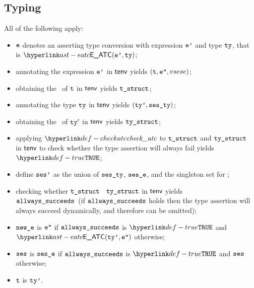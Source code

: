 \subsection{Typing}
\ProseParagraph
All of the following apply:
\begin{itemize}
  \item $\texttt{e}$ denotes an asserting type conversion with expression $\texttt{e'}$ and type $\texttt{ty}$, that is $\EATC(\vep, \tty)$;
  \item annotating the expression $\texttt{e'}$ in $\textsf{tenv}$ yields $(\texttt{t}, \texttt{e''}, \\vsese)$\ProseOrTypeError;
  \item obtaining the \structure\ of $\texttt{t}$ in $\textsf{tenv}$ yields $\texttt{t\_struct}$\ProseOrTypeError;
  \item annotating the type $\texttt{ty}$ in $\textsf{tenv}$ yields $(\texttt{ty'}, \texttt{ses\_ty})$\ProseOrTypeError;
  \item obtaining the \structure\ of $\texttt{ty}'$ in $\textsf{tenv}$ yields $\texttt{ty\_struct}$\ProseOrTypeError;
  \item applying $\checkatc$ to $\texttt{t\_struct}$ and $\texttt{ty\_struct}$ in $\textsf{tenv}$ to check whether the type assertion
        will always fail yields $\True$\ProseOrTypeError;
  \item define $\texttt{ses'}$ as the union of $\texttt{ses\_ty}$, $\texttt{ses\_e}$, and the singleton set for \PerformsAssertions;
  \item checking whether $\texttt{t\_struct}$ \subtypesatisfies\ $\texttt{ty\_struct}$ in $\textsf{tenv}$ yields \\
        $\texttt{allways\_succeeds}$\ProseOrTypeError\
        (if $\texttt{allways\_succeeds}$ holds then the type assertion will always succeed dynamically, and therefore can be omitted);
  \item $\texttt{new\_e}$ is $\texttt{e''}$ if $\texttt{allways\_succeeds}$ is $\True$ and $\EATC(\ttyp, \vepp)$ otherwise;
  \item $\texttt{ses}$ is $\texttt{ses\_e}$ if $\texttt{allways\_succeeds}$ is $\True$ and $\texttt{ses}$ otherwise;
  \item $\texttt{t}$ is $\texttt{ty'}$.
\end{itemize}
\FormallyParagraph
